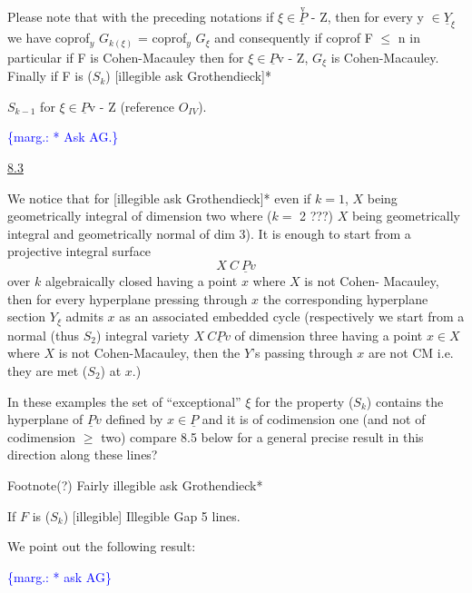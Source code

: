 \documentclass[11pt]{article}
\newcommand{\scanpage}[1]{\par\bigskip\noindent{\small\sffamily[scan #1]}\par}
\newcommand{\mspage}[1]{{\small\sffamily[p.\,#1]}}
\newcommand{\margin}[1]{\textcolor{blue}{\{\textsf{marg.:} #1\}}}
\newcommand{\uline}[1]{\underline{#1}}
\begin{document}
Please note that with the preceding notations if $\xi \in \overset{\mathrm{v}}{\underline{P}}$ - Z,
then for every y $\in \underline{Y}_{\xi}$ we have coprof$_{y}$ $G_{k(\xi)}$ = coprof$_{y}$ $G_{\xi}$ and
consequently if coprof F $\leq$ n in particular if F is Cohen-Macauley
then for $\xi \in \underline{P}$v - Z, $G_{\xi}$ is Cohen-Macauley.  Finally if F is ($S_{k}$)
[illegible ask Grothendieck]*

$S_{k-1}$ for $\xi \in \underline{P}$v - Z (reference $O_{IV}$).

\margin{* Ask AG.}

\clearpage
\scanpage{24/38}
\mspage{38}

\uline{8.3}

We notice that for [illegible ask Grothendieck]* even if
$k = 1$, $X$ being geometrically integral of dimension two where ($k =$
2 ???) $X$ being geometrically integral and geometrically normal of
dim 3).  It is enough to start from a projective integral surface
\[ X \ C \ \underline{P}v \]
over $k$ algebraically closed having a point $x$ where $X$ is not Cohen-%
Macauley, then for every hyperplane pressing through $x$ the
corresponding hyperplane section $Y_{\xi}$ admits $x$ as an associated
embedded cycle (respectively we start from a normal (thus $S_2$)
integral variety $X \ C\underline{P}v$ of dimension three having a point $x \in X$
where $X$ is not Cohen-Macauley, then the $Y$'s passing through $x$ are
not CM i.e. they are met ($S_2$) at $x$.)

In these examples the set of ``exceptional'' $\xi$ for the property
($S_k$) contains the hyperplane of $\underline{P}v$ defined by $x \in \underline{P}$ and it is of
codimension one (and not of codimension $\geq$ two) compare 8.5 below
for a general precise result in this direction along these lines?

Footnote(?)  Fairly illegible ask Grothendieck*

If $F$ is ($S_k$) [illegible]
Illegible Gap  5 lines.

We point out the following result:

\margin{* ask AG}

\clearpage
\scanpage{24/39}
\mspage{39}
\end{document}
